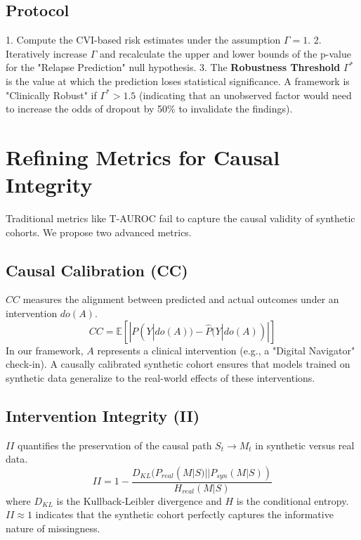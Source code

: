 \documentclass{article}
\begin{document}
\subsection{Protocol}
1. Compute the CVI-based risk estimates under the assumption $\Gamma=1$.
2. Iteratively increase $\Gamma$ and recalculate the upper and lower bounds of the p-value for the "Relapse Prediction" null hypothesis.
3. The \textbf{Robustness Threshold} $\Gamma^*$ is the value at which the prediction loses statistical significance. A framework is "Clinically Robust" if $\Gamma^* > 1.5$ (indicating that an unobserved factor would need to increase the odds of dropout by 50\% to invalidate the findings).

\section{Refining Metrics for Causal Integrity}

Traditional metrics like T-AUROC fail to capture the causal validity of synthetic cohorts. We propose two advanced metrics.

\subsection{Causal Calibration (CC)}
$CC$ measures the alignment between predicted and actual outcomes under an intervention $do(A)$.
\begin{equation}
    CC = \mathbb{E} [ | P(Y | do(A)) - \hat{P}(Y | do(A)) | ]
\end{equation}
In our framework, $A$ represents a clinical intervention (e.g., a "Digital Navigator" check-in). A causally calibrated synthetic cohort ensures that models trained on synthetic data generalize to the real-world effects of these interventions.

\subsection{Intervention Integrity (II)}
$II$ quantifies the preservation of the causal path $S_t \rightarrow M_t$ in synthetic versus real data.
\begin{equation}
    II = 1 - \frac{D_{KL}(P_{real}(M | S) || P_{syn}(M | S))}{H_{real}(M | S)}
\end{equation}
where $D_{KL}$ is the Kullback-Leibler divergence and $H$ is the conditional entropy. $II \approx 1$ indicates that the synthetic cohort perfectly captures the informative nature of missingness.
\end{document}
